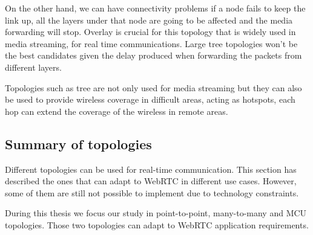 On the other hand, we can have connectivity problems if a node fails to keep the link up, all the layers under that node are going to be affected and the media forwarding will stop. Overlay is crucial for this topology that is widely used in media streaming, for real time communications. Large tree topologies won't be the best candidates given the delay produced when forwarding the packets from different layers.

Topologies such as tree are not only used for media streaming but they can also be used to provide wireless coverage in difficult areas, acting as hotspots, each hop can extend the coverage of the wireless in remote areas.

\subsection{Summary of topologies}

Different topologies can be used for real-time communication. This section has described the ones that can adapt to WebRTC in different use cases. However, some of them are still not possible to implement due to technology constraints. 

During this thesis we focus our study in point-to-point, many-to-many and MCU topologies. Those two topologies can adapt to WebRTC application requirements. 